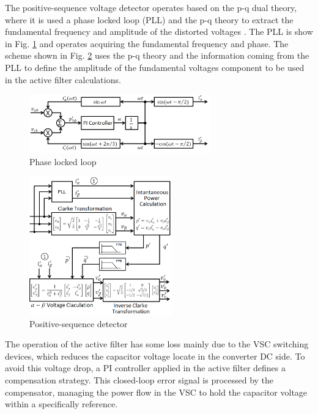 The positive-sequence voltage detector operates based on the p-q dual theory, where it is used a phase locked loop (PLL) and the p-q theory to extract the fundamental frequency and amplitude of the distorted voltages \citep{Akagi2007}. The PLL is show in Fig. \ref{fig:PLL.png} and operates acquiring the fundamental frequency and phase. The scheme shown in Fig. \ref{fig:detector_seq_positiva.png} uses the p-q theory and the information coming from the PLL to define the amplitude of the fundamental voltages component to be used in the active filter calculations.


\begin{figure}[!b]
	\centering
	\includegraphics[width=0.70\textwidth]{Figures/PLL.png}
	\caption{Phase locked loop}
	\label{fig:PLL.png}
\end{figure}

\begin{figure}[!b]
	\centering
	\includegraphics[width=0.55\textwidth]{Figures/detector_seq_positiva.png}
	\caption{Positive-sequence detector}
	\label{fig:detector_seq_positiva.png}
\end{figure}

The operation of the active filter has some loss mainly due to the VSC switching devices, which reduces the capacitor voltage locate in the converter DC side. To avoid this voltage drop, a PI controller applied in the active filter defines a compensation strategy. This closed-loop error signal is processed by the compensator, managing the power flow in the VSC to hold the capacitor voltage within a specifically reference.
